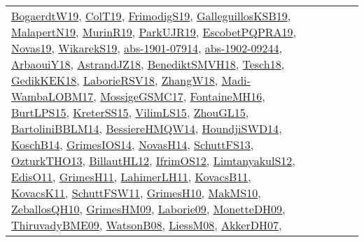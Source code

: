 {\begin{longtable}{lp{3cm}>{\raggedright}p{6cm}>{\raggedright}p{6cm}p{8cm}}
\href{papers/BogaerdtW19.pdf}{BogaerdtW19}\cite{BogaerdtW19}, \href{papers/ColT19.pdf}{ColT19}\cite{ColT19}, \href{papers/FrimodigS19.pdf}{FrimodigS19}\cite{FrimodigS19}, \href{papers/GalleguillosKSB19.pdf}{GalleguillosKSB19}\cite{GalleguillosKSB19}, \href{papers/MalapertN19.pdf}{MalapertN19}\cite{MalapertN19}, \href{papers/MurinR19.pdf}{MurinR19}\cite{MurinR19}, \href{papers/ParkUJR19.pdf}{ParkUJR19}\cite{ParkUJR19}, \href{articles/EscobetPQPRA19.pdf}{EscobetPQPRA19}\cite{EscobetPQPRA19}, \href{articles/Novas19.pdf}{Novas19}\cite{Novas19}, \href{articles/WikarekS19.pdf}{WikarekS19}\cite{WikarekS19}, \href{articles/abs-1901-07914.pdf}{abs-1901-07914}\cite{abs-1901-07914}, \href{articles/abs-1902-09244.pdf}{abs-1902-09244}\cite{abs-1902-09244}, \href{papers/ArbaouiY18.pdf}{ArbaouiY18}\cite{ArbaouiY18}, \href{papers/AstrandJZ18.pdf}{AstrandJZ18}\cite{AstrandJZ18}, \href{papers/BenediktSMVH18.pdf}{BenediktSMVH18}\cite{BenediktSMVH18}, \href{papers/Tesch18.pdf}{Tesch18}\cite{Tesch18}, \href{articles/GedikKEK18.pdf}{GedikKEK18}\cite{GedikKEK18}, \href{articles/LaborieRSV18.pdf}{LaborieRSV18}\cite{LaborieRSV18}, \href{articles/ZhangW18.pdf}{ZhangW18}\cite{ZhangW18}, \href{papers/Madi-WambaLOBM17.pdf}{Madi-WambaLOBM17}\cite{Madi-WambaLOBM17}, \href{papers/MossigeGSMC17.pdf}{MossigeGSMC17}\cite{MossigeGSMC17}, \href{papers/FontaineMH16.pdf}{FontaineMH16}\cite{FontaineMH16}, \href{papers/BurtLPS15.pdf}{BurtLPS15}\cite{BurtLPS15}, \href{papers/KreterSS15.pdf}{KreterSS15}\cite{KreterSS15}, \href{papers/VilimLS15.pdf}{VilimLS15}\cite{VilimLS15}, \href{papers/ZhouGL15.pdf}{ZhouGL15}\cite{ZhouGL15}, \href{papers/BartoliniBBLM14.pdf}{BartoliniBBLM14}\cite{BartoliniBBLM14}, \href{papers/BessiereHMQW14.pdf}{BessiereHMQW14}\cite{BessiereHMQW14}, \href{papers/HoundjiSWD14.pdf}{HoundjiSWD14}\cite{HoundjiSWD14}, \href{papers/KoschB14.pdf}{KoschB14}\cite{KoschB14}, \href{articles/GrimesIOS14.pdf}{GrimesIOS14}\cite{GrimesIOS14}, \href{articles/NovasH14.pdf}{NovasH14}\cite{NovasH14}, \href{papers/SchuttFS13.pdf}{SchuttFS13}\cite{SchuttFS13}, \href{articles/OzturkTHO13.pdf}{OzturkTHO13}\cite{OzturkTHO13}, \href{papers/BillautHL12.pdf}{BillautHL12}\cite{BillautHL12}, \href{papers/IfrimOS12.pdf}{IfrimOS12}\cite{IfrimOS12}, \href{articles/LimtanyakulS12.pdf}{LimtanyakulS12}\cite{LimtanyakulS12}, \href{papers/EdisO11.pdf}{EdisO11}\cite{EdisO11}, \href{papers/GrimesH11.pdf}{GrimesH11}\cite{GrimesH11}, \href{papers/LahimerLH11.pdf}{LahimerLH11}\cite{LahimerLH11}, \href{articles/KovacsB11.pdf}{KovacsB11}\cite{KovacsB11}, \href{articles/KovacsK11.pdf}{KovacsK11}\cite{KovacsK11}, \href{articles/SchuttFSW11.pdf}{SchuttFSW11}\cite{SchuttFSW11}, \href{papers/GrimesH10.pdf}{GrimesH10}\cite{GrimesH10}, \href{papers/MakMS10.pdf}{MakMS10}\cite{MakMS10}, \href{articles/ZeballosQH10.pdf}{ZeballosQH10}\cite{ZeballosQH10}, \href{papers/GrimesHM09.pdf}{GrimesHM09}\cite{GrimesHM09}, \href{papers/Laborie09.pdf}{Laborie09}\cite{Laborie09}, \href{papers/MonetteDH09.pdf}{MonetteDH09}\cite{MonetteDH09}, \href{papers/ThiruvadyBME09.pdf}{ThiruvadyBME09}\cite{ThiruvadyBME09}, \href{papers/WatsonB08.pdf}{WatsonB08}\cite{WatsonB08}, \href{articles/LiessM08.pdf}{LiessM08}\cite{LiessM08}, \href{papers/AkkerDH07.pdf}{AkkerDH07}\cite{AkkerDH07}, 
\end{longtable}}
